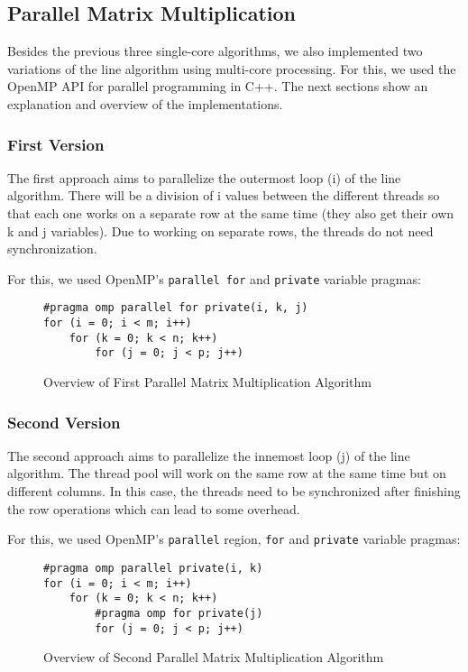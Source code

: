 \subsection{Parallel Matrix Multiplication}

Besides the previous three single-core algorithms, we also implemented two variations of the line algorithm using multi-core processing. For this, we used the OpenMP API for parallel programming in C++. The next sections show an explanation and overview of the implementations.

\subsubsection{First Version}

The first approach aims to parallelize the outermost loop (i) of the line algorithm. There will be a division of i values between the different threads so that each one works on a separate row at the same time (they also get their own k and j variables). Due to working on separate rows, the threads do not need synchronization.

For this, we used OpenMP's \verb#parallel for# and \verb#private# variable pragmas:

\begin{figure}[ht!]
\begin{verbatim}
#pragma omp parallel for private(i, k, j)
for (i = 0; i < m; i++)
    for (k = 0; k < n; k++)
        for (j = 0; j < p; j++)
\end{verbatim}
\caption{Overview of First Parallel Matrix Multiplication Algorithm}
\label{fig:algo:parallel1}
\end{figure}

\subsubsection{Second Version}

The second approach aims to parallelize the innemost loop (j) of the line algorithm. The thread pool will work on the same row at the same time but on different columns. In this case, the threads need to be synchronized after finishing the row operations which can lead to some overhead.

For this, we used OpenMP's \verb#parallel# region, \verb#for# and \verb#private# variable pragmas:

\begin{figure}[ht!]
\begin{verbatim}
#pragma omp parallel private(i, k)
for (i = 0; i < m; i++)
    for (k = 0; k < n; k++)
        #pragma omp for private(j)
        for (j = 0; j < p; j++)
\end{verbatim}
\caption{Overview of Second Parallel Matrix Multiplication Algorithm}
\label{fig:algo:parallel2}
\end{figure}
